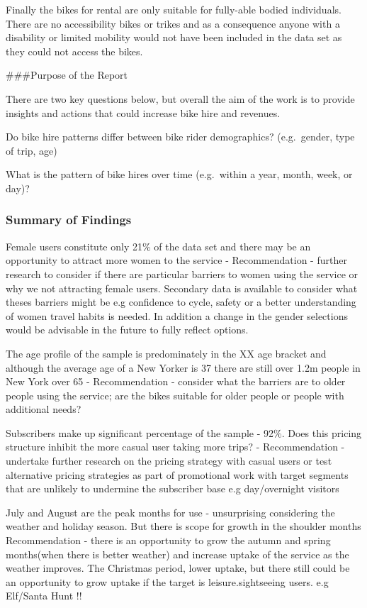 \documentclass[
]{article}
\begin{document}
Finally the bikes for rental are only suitable for fully-able bodied
individuals. There are no accessibility bikes or trikes and as a
consequence anyone with a disability or limited mobility would not have
been included in the data set as they could not access the bikes.

\#\#\#Purpose of the Report

There are two key questions below, but overall the aim of the work is to
provide insights and actions that could increase bike hire and revenues.

Do bike hire patterns differ between bike rider demographics?
(e.g.~gender, type of trip, age)

What is the pattern of bike hires over time (e.g.~within a year, month,
week, or day)?

\hypertarget{summary-of-findings}{%
\subsubsection{Summary of Findings}\label{summary-of-findings}}

Female users constitute only 21\% of the data set and there may be an
opportunity to attract more women to the service - Recommendation -
further research to consider if there are particular barriers to women
using the service or why we not attracting female users. Secondary data
is available to consider what theses barriers might be e.g confidence to
cycle, safety or a better understanding of women travel habits is
needed. In addition a change in the gender selections would be advisable
in the future to fully reflect options.

The age profile of the sample is predominately in the XX age bracket and
although the average age of a New Yorker is 37 there are still over 1.2m
people in New York over 65 - Recommendation - consider what the barriers
are to older people using the service; are the bikes suitable for older
people or people with additional needs?

Subscribers make up significant percentage of the sample - 92\%. Does
this pricing structure inhibit the more casual user taking more trips? -
Recommendation - undertake further research on the pricing strategy with
casual users or test alternative pricing strategies as part of
promotional work with target segments that are unlikely to undermine the
subscriber base e.g day/overnight visitors

July and August are the peak months for use - unsurprising considering
the weather and holiday season. But there is scope for growth in the
shoulder months Recommendation - there is an opportunity to grow the
autumn and spring months(when there is better weather) and increase
uptake of the service as the weather improves. The Christmas period,
lower uptake, but there still could be an opportunity to grow uptake if
the target is leisure.sightseeing users. e.g Elf/Santa Hunt !!
\end{document}
